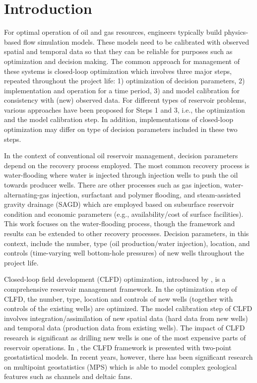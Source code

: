 \documentclass[11pt]{article}
\begin{document}
\section{Introduction}
For optimal operation of oil and gas resources, engineers
typically build physics-based flow simulation models. These models need to be calibrated
with observed spatial and temporal data so that they can be reliable for purposes such as optimization
and decision making.
The common approach
for management of these systems is closed-loop optimization which
involves three major steps, repeated throughout the project life: 1) optimization of decision parameters,
2) implementation and operation for a time period, 3) and model calibration for consistency with (new) observed data.
For different types of reservoir problems, various approaches have been proposed for Steps 1 and 3, i.e., the optimization and the model calibration step.
In addition, implementations of closed-loop optimization may differ on type of decision parameters included in these two steps.


In the context of conventional oil reservoir management,
decision parameters depend on the recovery process employed.
The most common recovery process is water-flooding where water is injected through injection wells to push the oil towards producer wells.
There are other processes such as gas injection, water-alternating-gas injection, surfactant and polymer flooding, and
steam-assisted gravity drainage (SAGD) which are employed based on subsurface reservoir condition and economic parameters (e.g., availability/cost of surface facilities).
This work focuses on the water-flooding process, though the framework and results can be extended to other recovery processes.
Decision parameters, in this context, include the number, type (oil production/water injection), location, and controls (time-varying well bottom-hole pressures) of new wells
throughout the project life.


Closed-loop field development (CLFD) optimization, introduced by \citet{shirangi:15b},
is a comprehensive reservoir management framework.
In the optimization step of CLFD, the number, type, location and controls
of new wells (together with controls of the existing wells) are optimized.
The model calibration step of CLFD involves integration/assimilation of new
spatial data (hard data from new wells) and temporal data (production data from existing wells).
The impact of CLFD research is significant as drilling new wells is
one of the most expensive parts of reservoir operations.
In \citet{shirangi:15b}, the CLFD framework is presented with two-point geostatistical models.
In recent years, however, there has been significant research on multipoint geostatistics (MPS)
which is able to model complex geological features such as channels and deltaic fans.
\end{document}
